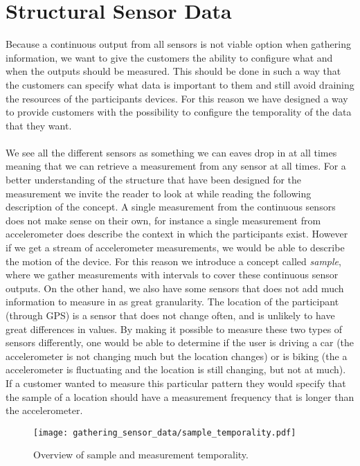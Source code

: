 \section{Structural Sensor Data}
\label{sec:structural_sensor_data}
Because a continuous output from all sensors is not viable option when gathering information, we want to give the customers the ability to configure what and when the outputs should be measured. This should be done in such a way that the customers can specify what data is important to them and still avoid draining the resources of the participants devices. For this reason we have designed a way to provide customers with the possibility to configure the temporality of the data that they want. 
\\\\
We see all the different sensors as something we can eaves drop in at all times meaning that we can retrieve a measurement from any sensor at all times. For a better understanding of the structure that have been designed for the measurement we invite the reader to look at  while reading the following description of the concept. A single measurement from the continuous sensors does not make sense on their own, for instance a single measurement from accelerometer does describe the context in which the participants exist. However if we get a stream of accelerometer measurements, we would be able to describe the motion of the device. For this reason we introduce a concept called \emph{sample}, where we gather measurements with intervals to cover these continuous sensor outputs. On the other hand, we also have some sensors that does not add much information to measure in as great granularity. The location of the participant (through GPS) is a sensor that does not change often, and is unlikely to have great differences in values. By making it possible to measure these two types of sensors differently, one would be able to determine if the user is driving a car (the accelerometer is not changing much but the location changes) or is biking (the a accelerometer is fluctuating and the location is still changing, but not at much). If a customer wanted to measure this particular pattern they would specify that the sample of a location should have a measurement frequency that is longer than the accelerometer.
\begin{figure}[!htbp]
    \centering
    \texttt{[image: gathering\_sensor\_data/sample\_temporality.pdf]}
    \caption{Overview of sample and measurement temporality.}
    \label{fig:sample_temporality}
\end{figure}
\FloatBarrier


